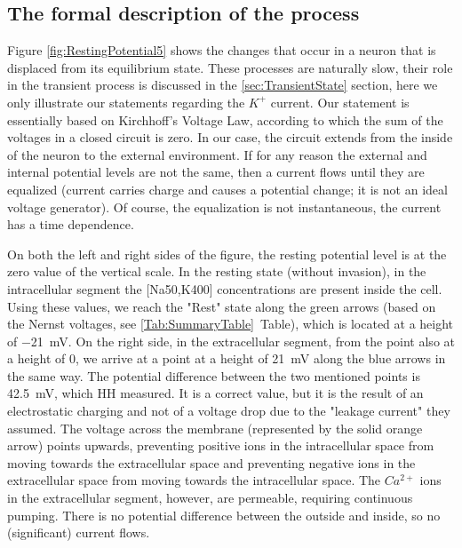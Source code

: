 \subsection[The formal description of the process]
{The formal description of the process\label{sec:Fallacies-OutwardKPhysicsFormal}}

Figure \ref{fig:RestingPotential5} shows the changes that occur in a neuron that is displaced from its equilibrium state.
These processes are naturally slow, their role in the
transient process is discussed in the \ref{sec:TransientState} section,
here we only illustrate our statements regarding the $K^+$ current.
Our statement is essentially based on Kirchhoff's Voltage Law,
according to which the sum of the voltages in a closed circuit is zero.
 In our case, the circuit extends from the inside of the neuron to the external environment.
If for any reason the external and internal potential levels are not the same, then a current flows until they are equalized (current carries charge and causes a potential change; it is not an ideal voltage generator).
Of course, the equalization is not
instantaneous, the current has a time dependence.

On both the left and right sides of the figure, the resting potential level is
at the zero value of the vertical scale. In the resting state (without invasion),
in the intracellular segment
the [Na50,K400] concentrations are present inside the cell. Using these values, we reach the "Rest"
state along the green arrows (based on the Nernst voltages, see \ref{Tab:SummaryTable}~Table), which is located at a height of \SI{-21}{\milli\volt}.
On the right side, in the extracellular segment, from the point also at a height of 0, we arrive at a point at a height of \SI{21}{\milli\volt} along the blue arrows in the same way. The potential difference between the two mentioned points is \SI{42.5}{\milli\volt}, which \gls{HH} measured. It is a correct value,
but it is the result of an electrostatic charging and not of a voltage drop due to the "leakage current" they assumed.
The voltage across the membrane (represented by the solid orange arrow) points upwards, preventing positive ions in the intracellular space from moving towards the extracellular space and preventing negative ions in the extracellular space from moving towards the intracellular space. The $Ca^{2+}$ ions in the extracellular segment, however, are permeable, requiring continuous pumping. There is no potential difference between the outside and inside, so no (significant) current flows.

